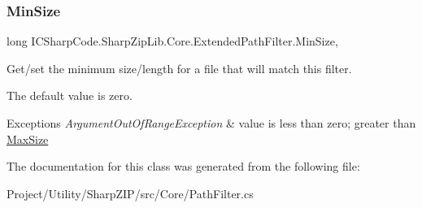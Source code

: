 \subsubsection{\texorpdfstring{Min\+Size}{MinSize}}
{\footnotesize\ttfamily long I\+C\+Sharp\+Code.\+Sharp\+Zip\+Lib.\+Core.\+Extended\+Path\+Filter.\+Min\+Size\hspace{0.3cm}{\ttfamily [get]}, {\ttfamily [set]}}



Get/set the minimum size/length for a file that will match this filter. 

The default value is zero.


\begin{DoxyExceptions}{Exceptions}
{\em Argument\+Out\+Of\+Range\+Exception} & value is less than zero; greater than \hyperlink{class_i_c_sharp_code_1_1_sharp_zip_lib_1_1_core_1_1_extended_path_filter_acd1bf418b764a27b2e7a87746e4b3867}{Max\+Size}\\
\hline
\end{DoxyExceptions}


The documentation for this class was generated from the following file\+:\begin{DoxyCompactItemize}
\item 
Project/\+Utility/\+Sharp\+Z\+I\+P/src/\+Core/Path\+Filter.\+cs\end{DoxyCompactItemize}
